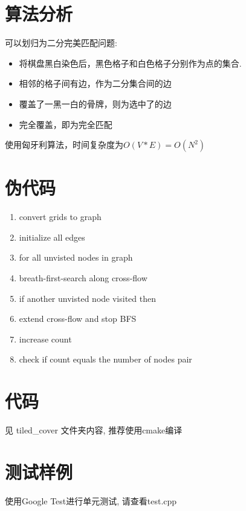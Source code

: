 \documentclass{article}
\begin{document}
\section{算法分析}
可以划归为二分完美匹配问题: 
\begin{itemize}
	\item 将棋盘黑白染色后，黑色格子和白色格子分别作为点的集合. 
	\item 相邻的格子间有边，作为二分集合间的边
	\item 覆盖了一黑一白的骨牌，则为选中了的边
	\item 完全覆盖，即为完全匹配
\end{itemize}	
使用匈牙利算法，时间复杂度为$O(V*E) = O(N^2)$
\section{伪代码}
\begin{enumerate}
	\item convert grids to graph
	\item initialize all edges
	\item for all unvisted nodes in graph
	\item \quad breath-first-search along cross-flow
	\item \qquad if another unvisted node visited then
	\item \quad \qquad extend cross-flow and stop BFS
	\item \quad \qquad increase count 
	\item check if count equals the number of nodes pair
\end{enumerate}
\section{代码}
见 tiled\_cover 文件夹内容, 推荐使用cmake编译
\section{测试样例}
使用Google Test进行单元测试, 请查看test.cpp 
\end{document}
